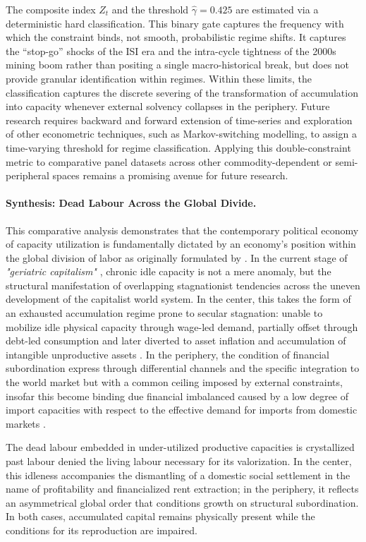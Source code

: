 The composite index $Z_t$ and the threshold $\hat{\gamma} = 0.425$ are estimated via a deterministic hard classification. This binary gate captures the frequency with which the constraint binds, not smooth, probabilistic regime shifts. It captures the ``stop-go'' shocks of the ISI era and the intra-cycle tightness of the 2000s mining boom rather than positing a single macro-historical break, but does not provide granular identification within regimes. Within these limits, the classification captures the discrete severing of the transformation of accumulation into capacity whenever external solvency collapses in the periphery. Future research requires backward and forward extension of time-series and exploration of other econometric techniques, such as Markov-switching modelling, to assign a time-varying threshold for regime classification. Applying this double-constraint metric to comparative panel datasets across other commodity-dependent or semi-peripheral spaces remains a promising avenue for future research.

\paragraph{Synthesis: Dead Labour Across the Global Divide.}
This comparative analysis demonstrates that the contemporary political economy of capacity utilization is fundamentally dictated by an economy's position within the global division of labor as originally formulated by \citet{Prebisch1981}. In the current stage of \textit{"geriatric capitalism"} \citep{Vidal2019}, chronic idle capacity is not a mere anomaly, but the structural manifestation of overlapping stagnationist tendencies across the uneven development of the capitalist world system. In the center, this takes the form of an exhausted accumulation regime prone to secular stagnation: unable to mobilize idle physical capacity through wage-led demand, partially offset through debt-led consumption and later diverted to asset inflation and accumulation of intangible unproductive assets \citep{Rotta2018, Rikap2021}. In the periphery, the condition of financial subordination express through differential channels and the specific integration to the world market but with a common ceiling imposed by external constraints, insofar this become binding due financial imbalanced caused by a low degree of import capacities with respect to the effective demand for imports from domestic markets \citep{McCombieThirwall1994}.

The dead labour embedded in under-utilized productive capacities is crystallized past labour denied the living labour necessary for its valorization. In the center, this idleness accompanies the dismantling of a domestic social settlement in the name of profitability and financialized rent extraction; in the periphery, it reflects an asymmetrical global order that conditions growth on structural subordination. In both cases, accumulated capital remains physically present while the conditions for its reproduction are impaired.